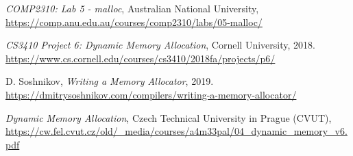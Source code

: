 \begin{thebibliography}{9}
  \emph{COMP2310: Lab 5 - malloc}, Australian National University, \\
  \url{https://comp.anu.edu.au/courses/comp2310/labs/05-malloc/}

  \emph{CS3410 Project 6: Dynamic Memory Allocation}, Cornell University, 2018. \\
  \url{https://www.cs.cornell.edu/courses/cs3410/2018fa/projects/p6/}

  D. Soshnikov, \emph{Writing a Memory Allocator}, 2019. \\
  \url{https://dmitrysoshnikov.com/compilers/writing-a-memory-allocator/}

  \emph{Dynamic Memory Allocation}, Czech Technical University in Prague (CVUT), \\
  \url{https://cw.fel.cvut.cz/old/_media/courses/a4m33pal/04_dynamic_memory_v6.pdf}

\end{thebibliography}